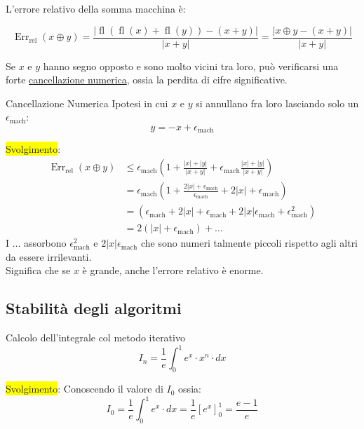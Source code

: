 \documentclass{article}
\begin{document}
L'errore relativo della somma macchina è:

\[
    \boxed{
        \operatorname{Err}_{\mathrm{rel}}(x\oplus y)
        =
        \frac{
            \left|
            \operatorname{fl}
            \left(
            \operatorname{fl}(x)+\operatorname{fl}(y)
            \right)
            -
            (x+y)
            \right|
        }{
            |x+y|
        }
        =
        \frac{
            |x\oplus y-(x+y)|
        }{
            |x+y|
        }}
\]

Se $x$ e $y$ hanno segno opposto e sono molto vicini tra loro, può verificarsi una forte \underline{cancellazione numerica}, ossia la perdita di cifre significative.

\begin{ex}{Cancellazione Numerica}{}
    Ipotesi in cui $x$ e $y$ si annullano fra loro lasciando solo un $\epsilon_{\mathrm{mach}}$:
    \[
        y=-x+\epsilon_{\mathrm{mach}}
    \]
\end{ex}
\colorbox{yellow}{Svolgimento}:
\begin{align*}
    \operatorname{Err}_{\mathrm{rel}}(x\oplus y) & \le\epsilon_{\mathrm{mach}}\left(1+\frac{|x|+|y|}{|x+y|}+\epsilon_{\mathrm{mach}}\frac{|x|+|y|}{|x+y|}\right)                        \\
                                                 & =\epsilon_{\mathrm{mach}}\left(1+\frac{2|x|+\epsilon_{\mathrm{mach}}}{\epsilon_{\mathrm{mach}}}+2|x|+\epsilon_{\mathrm{mach}}\right) \\
                                                 & =\left(\epsilon_{\mathrm{mach}}+2|x|+\epsilon_{\mathrm{mach}}+2|x|\epsilon_{\mathrm{mach}}+\epsilon_{\mathrm{mach}}^2\right)         \\
                                                 & =2\left(|x|+\epsilon_{\mathrm{mach}}\right)+\dots
\end{align*}
I $\dots$ assorbono $\epsilon_{\mathrm{mach}}^2$ e $2|x|\epsilon_{\mathrm{mach}}$ che sono numeri talmente piccoli rispetto agli altri da essere irrilevanti.\\
Significa che se $x$ è grande, anche l'errore relativo è enorme.\\

\subsection{Stabilità degli algoritmi}

\begin{ex}{Calcolo dell'integrale col metodo iterativo}{}
    \[I_n= \frac{1}{e}\int_{0}^{1}e^x\cdot x^n\cdot dx\]
\end{ex}
\colorbox{yellow}{Svolgimento}:
Conoscendo il valore di $I_0$ ossia: \[I_0=\frac{1}{e}\int_{0}^{1}e^x\cdot dx=\frac{1}{e}\left[e^x\right]^1_0=\frac{e-1}{e}\]
\end{document}
